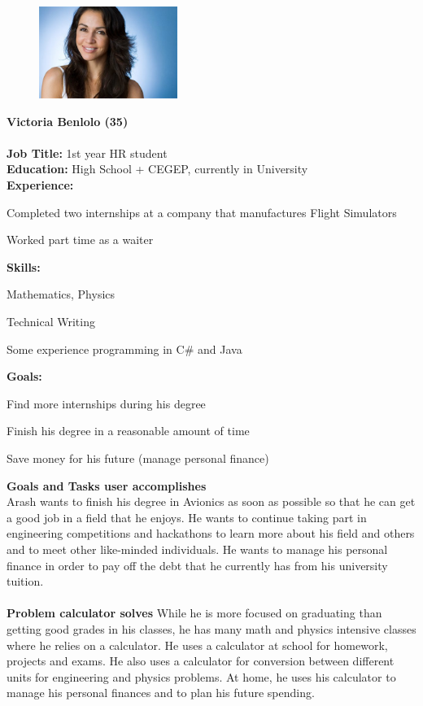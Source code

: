 \documentclass{article}
\begin{document}
\begin{figure}
\includegraphics[width=0.40\textwidth]{victoria.jpg}
\end{figure}
\textbf{\Large Victoria Benlolo (35)} \\ \\
\textbf{Job Title: }1st year HR student\\
\textbf{Education:} High School + CEGEP, currently in University\\
\textbf{Experience:}
\begin{compactitem}
\item Completed two internships at a company that manufactures Flight Simulators
\item Worked part time as a waiter
\end{compactitem}
\textbf{Skills:}
\begin{compactitem}
\item Mathematics, Physics
\item Technical Writing
\item Some experience programming in C\# and Java
\end{compactitem}
\textbf{Goals:}
\begin{compactitem}
\item Find more internships during his degree
\item Finish his degree in a reasonable amount of time
\item Save money for his future (manage personal finance)
\end{compactitem}
\bigskip 
\textbf{Goals and Tasks user accomplishes}\\
Arash wants to finish his degree in Avionics as soon as possible so that he can get a good job in a field that he enjoys. He wants to continue taking part in engineering competitions and hackathons to learn more about his field and others and to meet other like-minded individuals. He wants to manage his personal finance in order to pay off the debt that he currently has from his university tuition. \\ \\
\textbf{Problem calculator solves}
While he is more focused on graduating than getting good grades in his classes, he has many math and physics intensive classes where he relies on a calculator. He uses a calculator at school for homework, projects and exams. He also uses a calculator for conversion between different units for engineering and physics problems. At home, he uses his calculator to manage his personal finances and to plan his future spending. 
\pagebreak
\end{document}
